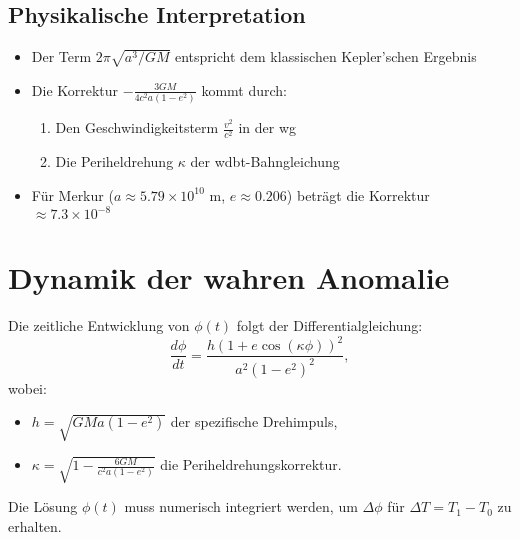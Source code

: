 \subsection*{Physikalische Interpretation}
\begin{itemize}
\item Der Term \( 2\pi \sqrt{a^3/GM} \) entspricht dem klassischen Kepler'schen Ergebnis
\item Die Korrektur \( -\frac{3GM}{4c^2 a(1-e^2)} \) kommt durch:
  \begin{enumerate}
  \item Den Geschwindigkeitsterm \( \frac{v^2}{c^2} \) in der \gls{wg}
  \item Die Periheldrehung \( \kappa \) der \gls{wdbt}-Bahngleichung
  \end{enumerate}
\item Für Merkur (\( a \approx 5.79 \times 10^{10} \) m, \( e \approx 0.206 \)) beträgt die Korrektur \( \approx 7.3 \times 10^{-8} \)
\end{itemize}

\section{Dynamik der wahren Anomalie}
Die zeitliche Entwicklung von \(\phi(t)\) folgt der Differentialgleichung:
\[
\frac{d\phi}{dt} = \frac{h (1 + e \cos(\kappa \phi))^2}{a^2 (1-e^2)^2},
\]
wobei:
\begin{itemize}
\item \(h = \sqrt{GMa(1-e^2)}\) der spezifische Drehimpuls,
\item \(\kappa = \sqrt{1 - \frac{6GM}{c^2 a(1-e^2)}}\) die Periheldrehungskorrektur.
\end{itemize}
Die Lösung \(\phi(t)\) muss numerisch integriert werden, um \(\Delta \phi\) für \(\Delta T = T_1 - T_0\) zu erhalten.
